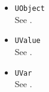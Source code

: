 \begin{itemize}
\item \lstinline|UObject|\\
  See .

\item \lstinline|UValue|\\
  See .

\item \lstinline|UVar|\\
  See .


\end{itemize}

